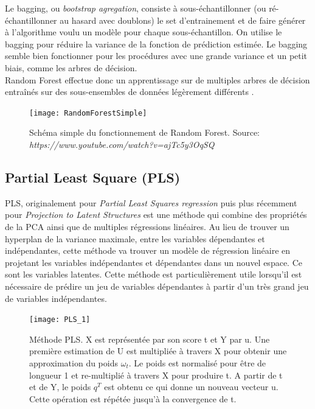 \noindent Le bagging\label{bagging}, ou \textit{bootstrap agregation}, consiste à sous-échantillonner (ou ré-échantillonner au hasard avec doublons) le set d'entrainement et de faire générer à l’algorithme voulu un modèle pour chaque sous-échantillon. On utilise le bagging pour réduire la variance de la fonction de prédiction estimée. Le bagging semble bien fonctionner pour les procédures avec une grande variance et un petit biais, comme les arbres de décision. \cite{hastie_09_elements-of.statistical-learning}\\


\noindent Random Forest effectue donc un apprentissage sur de multiples arbres de décision entraînés sur des sous-ensembles de données légèrement différents \cite{Statistics01randomforests}.


\begin{figure}[H]
	\texttt{[image: RandomForestSimple]}
	\caption{\label{RandomForestSchema} Schéma simple du fonctionnement de Random Forest. \newline Source: \textit{https://www.youtube.com/watch?v=ajTc5y3OqSQ}}
\end{figure}

\subsection{Partial Least Square (PLS)} 


PLS, originalement pour \textit{Partial Least Squares regression} puis plus récemment pour \textit{Projection to Latent Structures} est une méthode qui combine des propriétés de la PCA ainsi que de multiples régressions linéaires. Au lieu de trouver un hyperplan de la variance maximale, entre les variables dépendantes et indépendantes, cette méthode va trouver un modèle de régression linéaire en projetant les variables indépendantes et dépendantes dans un nouvel espace. Ce sont les variables latentes. Cette méthode est particulièrement utile lorsqu'il est nécessaire de prédire un jeu de variables dépendantes à partir d'un très grand jeu de variables indépendantes.  

\begin{figure}[H] 
	\centering
	\texttt{[image: PLS\_1]} 
	\caption{\label{PLSschema}Méthode PLS. X est représentée par son score t et Y par u. Une première estimation de U est multipliée à travers X pour obtenir une approximation du poids $ \omega_t $. Le poids est normalisé pour être de longueur 1 et re-multiplié à travers X pour produire t. A partir de t et de Y, le poids $ q^T $ est obtenu ce qui donne un nouveau vecteur u. Cette opération est répétée jusqu'à la convergence de t.\cite{CEM:CEM515}} 
\end{figure} 

